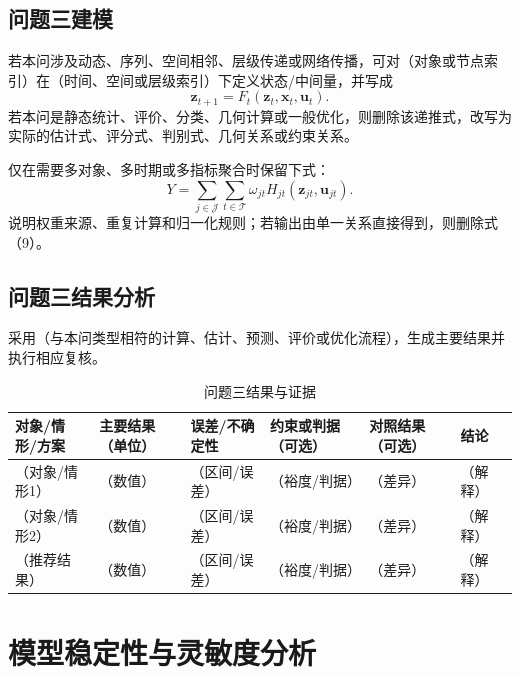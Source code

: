 \documentclass[UTF8,zihao=-4]{ctexart}
\newcommand{\fillin}[1]{（#1）}
\begin{document}
\subsection{问题三建模}

若本问涉及动态、序列、空间相邻、层级传递或网络传播，可对\fillin{对象或节点索引}在\fillin{时间、空间或层级索引}下定义状态/中间量，并写成
\begin{equation}
  \bm z_{t+1}=F_t(\bm z_t,\bm x_t,\bm u_t).
\end{equation}
若本问是静态统计、评价、分类、几何计算或一般优化，则删除该递推式，改写为实际的估计式、评分式、判别式、几何关系或约束关系。

仅在需要多对象、多时期或多指标聚合时保留下式：
\begin{equation}
  Y=\sum_{j\in\mathcal J}\sum_{t\in\mathcal T}
  \omega_{jt}H_{jt}(\bm z_{jt},\bm u_{jt}).
\end{equation}
说明权重来源、重复计算和归一化规则；若输出由单一关系直接得到，则删除式（9）。

\subsection{问题三结果分析}

采用\fillin{与本问类型相符的计算、估计、预测、评价或优化流程}，生成主要结果并执行相应复核。

\begin{table}[htbp]
  \centering
  \caption{问题三结果与证据}
  \small
  \begin{tabularx}{0.96\textwidth}{YYYYYY}
    \toprule
    对象/情形/方案 & 主要结果（单位） & 误差/不确定性 & 约束或判据（可选） & 对照结果（可选） & 结论 \\
    \midrule
    \fillin{对象/情形1} & \fillin{数值} & \fillin{区间/误差} & \fillin{裕度/判据} & \fillin{差异} & \fillin{解释} \\
    \fillin{对象/情形2} & \fillin{数值} & \fillin{区间/误差} & \fillin{裕度/判据} & \fillin{差异} & \fillin{解释} \\
    \fillin{推荐结果} & \fillin{数值} & \fillin{区间/误差} & \fillin{裕度/判据} & \fillin{差异} & \fillin{解释} \\
    \bottomrule
  \end{tabularx}
\end{table}

\section{模型稳定性与灵敏度分析}
\end{document}
